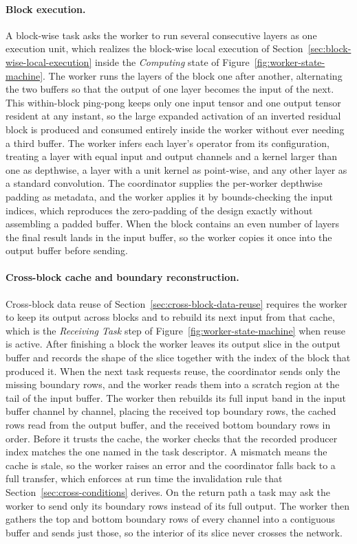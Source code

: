 \paragraph{Block execution.}
A block-wise task asks the worker to run several consecutive layers as one execution unit, which realizes the block-wise local execution of Section~\ref{sec:block-wise-local-execution} inside the \emph{Computing} state of Figure~\ref{fig:worker-state-machine}.
The worker runs the layers of the block one after another, alternating the two buffers so that the output of one layer becomes the input of the next.
This within-block ping-pong keeps only one input tensor and one output tensor resident at any instant, so the large expanded activation of an inverted residual block is produced and consumed entirely inside the worker without ever needing a third buffer.
The worker infers each layer's operator from its configuration, treating a layer with equal input and output channels and a kernel larger than one as depthwise, a layer with a unit kernel as point-wise, and any other layer as a standard convolution.
The coordinator supplies the per-worker depthwise padding as metadata, and the worker applies it by bounds-checking the input indices, which reproduces the zero-padding of the design exactly without assembling a padded buffer.
When the block contains an even number of layers the final result lands in the input buffer, so the worker copies it once into the output buffer before sending.

\paragraph{Cross-block cache and boundary reconstruction.}
Cross-block data reuse of Section~\ref{sec:cross-block-data-reuse} requires the worker to keep its output across blocks and to rebuild its next input from that cache, which is the \emph{Receiving Task} step of Figure~\ref{fig:worker-state-machine} when reuse is active.
After finishing a block the worker leaves its output slice in the output buffer and records the shape of the slice together with the index of the block that produced it.
When the next task requests reuse, the coordinator sends only the missing boundary rows, and the worker reads them into a scratch region at the tail of the input buffer.
The worker then rebuilds its full input band in the input buffer channel by channel, placing the received top boundary rows, the cached rows read from the output buffer, and the received bottom boundary rows in order.
Before it trusts the cache, the worker checks that the recorded producer index matches the one named in the task descriptor.
A mismatch means the cache is stale, so the worker raises an error and the coordinator falls back to a full transfer, which enforces at run time the invalidation rule that Section~\ref{sec:cross-conditions} derives.
On the return path a task may ask the worker to send only its boundary rows instead of its full output.
The worker then gathers the top and bottom boundary rows of every channel into a contiguous buffer and sends just those, so the interior of its slice never crosses the network.

